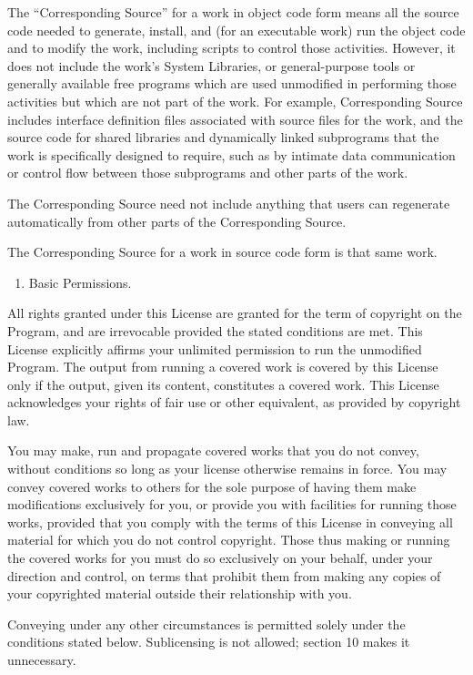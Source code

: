 \documentclass[11pt]{article}
\begin{document}
The “Corresponding Source” for a work in object code form means all the source code needed to generate, install, and (for an executable work) run the object code and to modify the work, including scripts to control those activities. However, it does not include the work's System Libraries, or general-purpose tools or generally available free programs which are used unmodified in performing those activities but which are not part of the work. For example, Corresponding Source includes interface definition files associated with source files for the work, and the source code for shared libraries and dynamically linked subprograms that the work is specifically designed to require, such as by intimate data communication or control flow between those subprograms and other parts of the work.

The Corresponding Source need not include anything that users can regenerate automatically from other parts of the Corresponding Source.

The Corresponding Source for a work in source code form is that same work.

\begin{enumerate}
\item Basic Permissions.
\end{enumerate}
All rights granted under this License are granted for the term of copyright on the Program, and are irrevocable provided the stated conditions are met. This License explicitly affirms your unlimited permission to run the unmodified Program. The output from running a covered work is covered by this License only if the output, given its content, constitutes a covered work. This License acknowledges your rights of fair use or other equivalent, as provided by copyright law.

You may make, run and propagate covered works that you do not convey, without conditions so long as your license otherwise remains in force. You may convey covered works to others for the sole purpose of having them make modifications exclusively for you, or provide you with facilities for running those works, provided that you comply with the terms of this License in conveying all material for which you do not control copyright. Those thus making or running the covered works for you must do so exclusively on your behalf, under your direction and control, on terms that prohibit them from making any copies of your copyrighted material outside their relationship with you.

Conveying under any other circumstances is permitted solely under the conditions stated below. Sublicensing is not allowed; section 10 makes it unnecessary.
\end{document}
